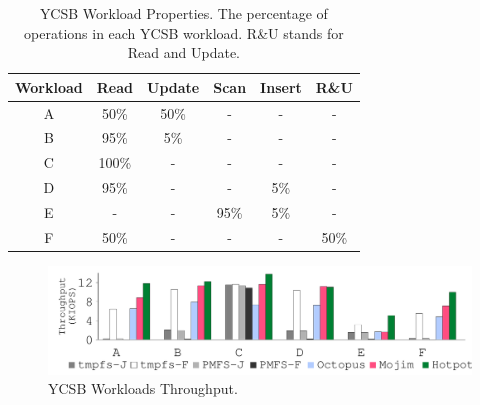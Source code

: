 {
\begin{table}[th]
\begin{center}
\begin{center}
\begin{tabular}{ c | c | c | c | c | c }\normalsize
\normalsize Workload & \normalsize Read & \normalsize Update & \normalsize Scan & \normalsize Insert & \normalsize R\&U \\
\hline
A & 50\% & 50\% & - & - & - \\
B & 95\% & 5\% & - & - & - \\
C & 100\% & - & - & - & - \\
D & 95\% & - & - & 5\% & - \\
E & - & - & 95\% & 5\% & - \\
F & 50\% & - & - & - & 50\% \\
\end{tabular}
\end{center}
\caption[YCSB Workload Properties.]
{
YCSB Workload Properties.
The percentage of operations in each YCSB workload. 
R\&U stands for Read and Update.
}
\label{tbl-ycsb}
\end{center}
\end{table}
}
{
\begin{figure}[th]
\begin{center}
\centerline{\includegraphics[width=\textwidth]{hotpot/Figures/g_plot_YCSB_run_throughput.pdf}}
\caption[YCSB Workloads Throughput.]{YCSB Workloads Throughput.}
\label{fig-ycsbrun}
\end{center}
\end{figure}
}
